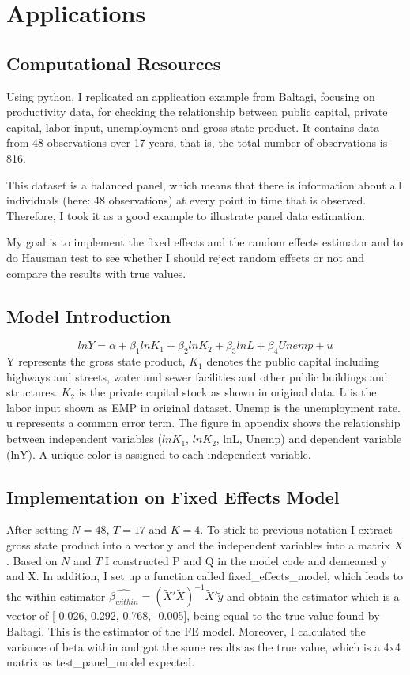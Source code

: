 \documentclass[11pt, a4paper, leqno]{article}
\begin{document}
\section{Applications}
\subsection{Computational Resources}
Using python, I replicated an application example from Baltagi, focusing on productivity data, for checking the relationship between public capital, private capital, labor input, unemployment and gross state product. It contains data from 48 observations over 17 years, that is, the total number of observations is 816.

This dataset is a balanced panel, which means that there is information about all individuals (here: 48 observations) at every point in time that is observed. Therefore, I took it as a good example to illustrate panel data estimation.

My goal is to implement the fixed effects and the random effects estimator and to do Hausman test to see whether I should reject random effects or not and compare the results with true values.


\subsection{Model Introduction}
   \begin{equation*} \label{eq:grunfeld}
   lnY=\alpha+\beta_1 ln K_1+\beta_2 lnK_2 + \beta_3 lnL + \beta_4 Unemp + u
   \end{equation*}
Y represents the gross state product, $K_1$ denotes the public capital including highways and streets, water and sewer facilities and other public buildings and structures. $K_2$ is the private capital stock as shown in original data. L is the labor input shown as EMP in original dataset. Unemp is the unemployment rate. u represents a common error term. The figure in appendix shows the relationship between independent variables ($ln K_1$, $ln K_2$, lnL, Unemp) and dependent variable (lnY). A unique color is assigned to each independent variable.

\subsection{Implementation on Fixed Effects Model}
After setting $N=48$, $T=17$ and $K=4$. To stick to previous notation I extract gross state product into a vector y and the independent variables into a matrix $X$. 
Based on $N$ and $T$ I constructed P and Q in the model code and demeaned y and X. In addition, I set up a function called fixed\_effects\_model, which leads to the within estimator $\widehat{\beta_{within}} = (\widetilde X'\widetilde X)^{-1}\widetilde X' \widetilde y$ and obtain the estimator which is a vector of [-0.026, 0.292, 0.768, -0.005], being equal to the true value found by Baltagi. This is the estimator of the FE model. Moreover, I calculated the variance of beta within and got the same results as the true value, which is a 4x4 matrix as test\_panel\_model expected.
\end{document}
